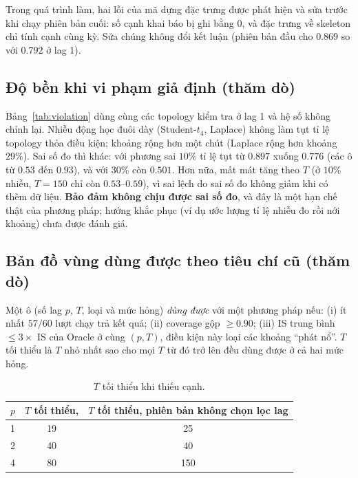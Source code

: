 \begin{table}[H]
\centering\footnotesize
\setlength{\tabcolsep}{3pt}

\caption{AUROC theo kịch bản ở lag 1 (cờ mới / cờ cũ; hai giá trị trong ô là mức hỏng $20\%$ và $50\%$).}\label{tab:flagscn}
\end{table}

Trong quá trình làm, hai lỗi của mã dựng đặc trưng được phát hiện và sửa trước khi chạy phiên bản cuối: số cạnh khai báo bị ghi bằng $0$, và đặc trưng về skeleton chỉ tính cạnh cùng kỳ. Sửa chúng không đổi kết luận (phiên bản đầu cho $0.869$ so với $0.792$ ở lag 1).

\subsection{Độ bền khi vi phạm giả định (thăm dò)}\label{sec:ben}
Bảng~\ref{tab:violation} dùng cùng các topology kiểm tra ở lag 1 và hệ số không chỉnh lại. Nhiễu động học đuôi dày (Student-$t_4$, Laplace) không làm tụt tỉ lệ topology thỏa điều kiện; khoảng rộng hơn một chút (Laplace rộng hơn khoảng $29\%$). Sai số đo thì khác: với phương sai $10\%$ tỉ lệ tụt từ $0.897$ xuống $0.776$ (các ô từ $0.53$ đến $0.93$), và với $30\%$ còn $0.501$. Hơn nữa, mất mát tăng theo $T$ (ở $10\%$ nhiễu, $T=150$ chỉ còn $0.53$--$0.59$), vì sai lệch do sai số đo không giảm khi có thêm dữ liệu. \textbf{Bảo đảm không chịu được sai số đo}, và đây là một hạn chế thật của phương pháp; hướng khắc phục (ví dụ ước lượng tỉ lệ nhiễu đo rồi nới khoảng) chưa được đánh giá.

\begin{table}[H]
\centering\small

\caption{Tỉ lệ topology thỏa điều kiện khi vi phạm giả định Gaussian sạch (lag 1, $550$ topology kiểm tra).}\label{tab:violation}
\end{table}

\subsection{Bản đồ vùng dùng được theo tiêu chí cũ (thăm dò)}\label{sec:vung-cu}
Một ô (số lag $p$, $T$, loại và mức hỏng) \emph{dùng được} với một phương pháp nếu: (i) ít nhất $57/60$ lượt chạy trả kết quả; (ii) coverage gộp $\ge0.90$; (iii) IS trung bình $\le3\times$ IS của Oracle ở cùng $(p,T)$, điều kiện này loại các khoảng ``phát nổ''. $T$ tối thiểu là $T$ nhỏ nhất sao cho mọi $T$ từ đó trở lên đều dùng được ở cả hai mức hỏng.
\begin{table}[H]
\centering\small
\begin{tabular}{ccc}
\toprule
$p$ & $T$ tối thiểu, \ours{} & $T$ tối thiểu, phiên bản không chọn lọc lag\\
\midrule
1 & 19 & 25\\
2 & 40 & 40\\
4 & 80 & 150\\
\bottomrule
\end{tabular}
\caption{$T$ tối thiểu khi thiếu cạnh.}\label{tab:vung}
\end{table}

